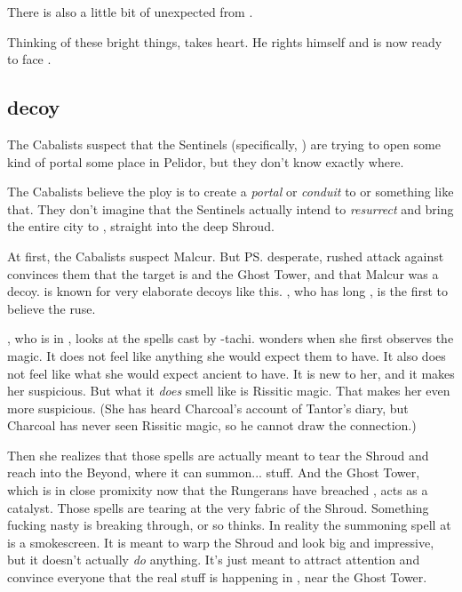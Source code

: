 \begin{garbage}
There is also a little bit of unexpected  from \Achsah. 

Thinking of these bright things, \Teshrial{} takes heart. 
He rights himself and is now ready to face \Ishnaruchaefir. 









\subsection{\Forklin{} decoy}
The Cabalists suspect that the Sentinels (specifically, \Secherdamon) are trying to open some kind of portal some place in Pelidor, but they don't know exactly where. 

The Cabalists believe the ploy is to create a \emph{portal} or \emph{conduit} to \Nithdornazsh{} or something like that. 
They don't imagine that the Sentinels actually intend to \emph{resurrect} \Nithdornazsh{} and bring the entire city to \Azmith, straight into the deep Shroud. 

At first, the Cabalists suspect Malcur. 
But \ps{\Takestsha} desperate, rushed attack against \Forklin{} convinces them that the target is \Forklin{} and the Ghost Tower, and that Malcur was a decoy. 
\Secherdamon{} is known for very elaborate decoys like this. 
\Achsah, who has long , is the first to believe the \Forklin{} ruse. 

\Achsah, who is in \Forklin, looks at the \quo{\EreshKali} spells cast by \Takestsha-tachi. 
\Achsah{} wonders when she first observes the \EreshKali{} magic. 
It does not feel like anything she would expect them to have. 
It also does not feel like what she would expect ancient \meccara{} to have. 
It is new to her, and it makes her suspicious. 
But what it \emph{does} smell like is Rissitic magic. 
That makes her even more suspicious. 
(She has heard Charcoal's account of Tantor's diary, but Charcoal has never seen Rissitic magic, so he cannot draw the connection.) 

Then she realizes that those spells are actually meant to tear the Shroud and reach into the Beyond, where it can summon... stuff. 
And the Ghost Tower, which is in close promixity now that the Rungerans have breached \Forklin, acts as a catalyst. 
Those spells are tearing at the very fabric of the Shroud. 
Something fucking nasty is breaking through, or so \Achsah{} thinks. 
In reality the summoning spell at \Forklin{} is a smokescreen. 
It is meant to warp the Shroud and look big and impressive, but it doesn't actually \emph{do} anything. 
It's just meant to attract attention and convince everyone that the real stuff is happening in \Forklin, near the Ghost Tower. 






\end{garbage}
